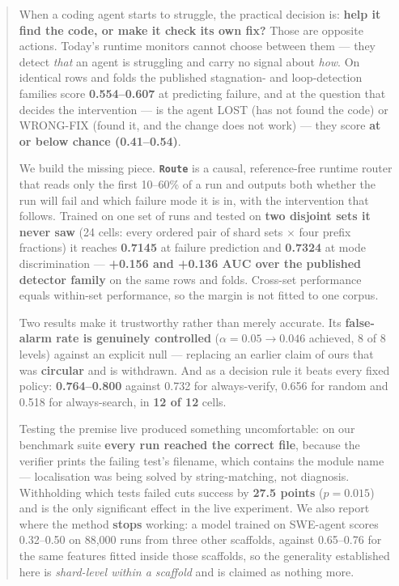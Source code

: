 \documentclass[10pt]{article}
\newcommand{\code}[1]{\texttt{\small #1}}
\begin{document}
\begin{abstract}
\noindent
When a coding agent starts to struggle, the practical decision is: \textbf{help it find the code,
or make it check its own fix?} Those are opposite actions. Today's runtime monitors cannot choose
between them --- they detect \emph{that} an agent is struggling and carry no signal about \emph{how}.
On identical rows and folds the published stagnation- and loop-detection families score
\textbf{0.554--0.607} at predicting failure, and at the question that decides the intervention ---
is the agent LOST (has not found the code) or WRONG-FIX (found it, and the change does not work) ---
they score \textbf{at or below chance (0.41--0.54)}.

We build the missing piece. \textbf{\code{Route}} is a causal, reference-free runtime router that
reads only the first 10--60\% of a run and outputs both whether the run will fail and which failure
mode it is in, with the intervention that follows. Trained on one set of runs and tested on
\textbf{two disjoint sets it never saw} (24 cells: every ordered pair of shard sets $\times$ four
prefix fractions) it reaches \textbf{0.7145} at failure prediction and \textbf{0.7324} at mode
discrimination --- \textbf{+0.156 and +0.136 AUC over the published detector family} on the same
rows and folds. Cross-set performance equals within-set performance, so the margin is not fitted to
one corpus.

Two results make it trustworthy rather than merely accurate. Its \textbf{false-alarm rate is
genuinely controlled} ($\alpha=0.05 \rightarrow 0.046$ achieved, 8 of 8 levels) against an explicit
null --- replacing an earlier claim of ours that was \textbf{circular} and is withdrawn. And as a
decision rule it beats every fixed policy: \textbf{0.764--0.800} against 0.732 for always-verify,
0.656 for random and 0.518 for always-search, in \textbf{12 of 12} cells.

Testing the premise live produced something uncomfortable: on our benchmark suite \textbf{every run
reached the correct file}, because the verifier prints the failing test's filename, which contains
the module name --- localisation was being solved by string-matching, not diagnosis. Withholding
which tests failed cuts success by \textbf{27.5 points} ($p = 0.015$) and is the only significant
effect in the live experiment. We also report where the method \textbf{stops} working: a model
trained on SWE-agent scores 0.32--0.50 on 88{,}000 runs from three other scaffolds, against
0.65--0.76 for the same features fitted inside those scaffolds, so the generality established here
is \emph{shard-level within a scaffold} and is claimed as nothing more.
\end{abstract}
\end{document}
